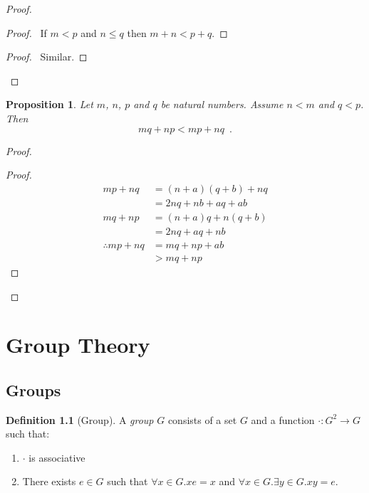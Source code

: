 \documentclass{book}
\let\qed\relax
\newtheorem{prop}[ax]{Proposition}
\theoremstyle{definition}
\newtheorem{df}[ax]{Definition}
\begin{document}
\begin{proof}
\pf
{}
\begin{proof}
	\pf\ If $m < p$ and $n \leq q$ then $m+n < p + q$.
\end{proof}
\begin{proof}
	\pf\ Similar.
\end{proof}
\qed
\end{proof}

\begin{prop}
\label{prop:intmultlemma}
Let $m$, $n$, $p$ and $q$ be natural numbers. Assume $n < m$ and $q < p$. Then
\[ mq + np < mp + nq \enspace . \]
\end{prop}

\begin{proof}
\pf
{}
\begin{proof}
	\pf
	\begin{align*}
		mp + nq & = (n+a) (q + b) + nq \\
		& = 2nq + nb + aq + ab \\
		mq + np & = (n + a) q + n (q + b) \\
		& = 2nq + aq + nb \\
		\therefore mp + nq & = mq + np + ab \\
		& > mq + np
	\end{align*}
\end{proof}
\qed
\end{proof}

\chapter{Group Theory}

\section{Groups}

\begin{df}[Group]
A \emph{group} $G$ consists of a set $G$ and a function $\cdot : G^2 \rightarrow G$ such that:
\begin{enumerate}
\item $\cdot$ is associative
\item There exists $e \in G$ such that $\forall x \in G. xe = x$ and $\forall x \in G. \exists y \in G. xy = e$.
\end{enumerate}
\end{df}
\end{document}
